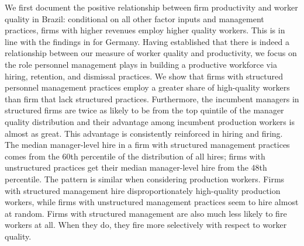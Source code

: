 We first document the positive relationship between firm productivity and worker quality in Brazil: conditional on all other factor inputs and management practices, firms with higher revenues employ higher quality workers. This is in line with the findings in \citet{Bender:Management:NBER:2016} for Germany. 
Having established that there is indeed a relationship between our measure of worker quality and productivity, we focus on the role personnel management plays in building a productive workforce via hiring, retention, and dismissal practices. We show that firms with structured personnel management practices employ a greater share of high-quality workers than firm that lack structured practices. Furthermore, the incumbent managers in structured firms are twice as likely to be from the top quintile of the manager quality distribution and their advantage among incumbent production workers is almost as great. This advantage is consistently reinforced in hiring and firing. The median manager-level hire in a firm with structured management practices comes from the 60th percentile of the distribution of all hires; firms with unstructured practices get their median manager-level hire from the 48th percentile. The pattern is similar when considering production workers. Firms with structured management hire disproportionately high-quality production workers, while firms with unstructured management practices seem to hire almost at random. Firms with structured management are also much less likely to fire workers at all. When they do, they fire more selectively with respect to worker quality. 

